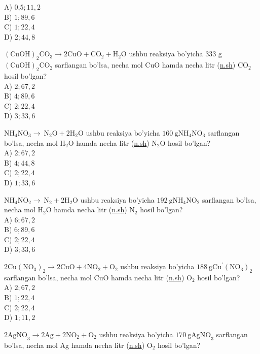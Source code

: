 A) 0,$5 ; 11,2$\\
B) $1 ; 89,6$\\
C) $1 ; 22,4$\\
D) $2 ; 44,8$
  \item $(\mathrm{CuOH})_{2} \mathrm{CO}_{3} \rightarrow 2 \mathrm{CuO}+\mathrm{CO}_{2}+\mathrm{H}_{2} \mathrm{O}$ ushbu reaksiya bo'yicha 333 g $(\mathrm{CuOH})_{2} \mathrm{CO}_{2}$ sarflangan bo'lsa, necha mol CuO hamda necha litr (\href{http://n.sh}{n.sh}) $\mathrm{CO}_{2}$ hosil bo'lgan?\\
A) $2 ; 67,2$\\
B) $4 ; 89,6$\\
C) $2 ; 22,4$\\
D) $3 ; 33,6$
  \item $\mathrm{NH}_{4} \mathrm{NO}_{3} \rightarrow \mathrm{~N}_{2} \mathrm{O}+2 \mathrm{H}_{2} \mathrm{O}$ ushbu reaksiya bo'yicha $160 \mathrm{~g} \mathrm{NH}_{4} \mathrm{NO}_{3}$ sarflangan bo'lsa, necha mol $\mathrm{H}_{2} \mathrm{O}$ hamda necha litr (\href{http://n.sh}{n.sh}) $\mathrm{N}_{2} \mathrm{O}$ hosil bo'lgan?\\
A) $2 ; 67,2$\\
B) $4 ; 44,8$\\
C) $2 ; 22,4$\\
D) $1 ; 33,6$
  \item $\mathrm{NH}_{4} \mathrm{NO}_{2} \rightarrow \mathrm{~N}_{2}+2 \mathrm{H}_{2} \mathrm{O}$ ushbu reaksiya bo'yicha $192 \mathrm{~g} \mathrm{NH}_{4} \mathrm{NO}_{2}$ sarflangan bo'lsa, necha mol $\mathrm{H}_{2} \mathrm{O}$ hamda necha litr (\href{http://n.sh}{n.sh}) $\mathrm{N}_{2}$ hosil bo'lgan?\\
A) $6 ; 67,2$\\
B) $6 ; 89,6$\\
C) $2 ; 22,4$\\
D) $3 ; 33,6$
  \item $2 \mathrm{Cu}\left(\mathrm{NO}_{3}\right)_{2} \rightarrow 2 \mathrm{CuO}+4 \mathrm{NO}_{2}+\mathrm{O}_{2}$ ushbu reaksiya bo'yicha $188 \mathrm{~g} \mathrm{Cu}^{\prime}\left(\mathrm{NO}_{3}\right)_{2}$ sarflangan bo'lsa, necha mol CuO hamda necha litr (\href{http://n.sh}{n.sh}) $\mathrm{O}_{2}$ hosil bo'lgan?\\
A) $2 ; 67,2$\\
B) $1 ; 22,4$\\
C) $2 ; 22,4$\\
D) $1 ; 11,2$
  \item $2 \mathrm{AgNO}_{3} \rightarrow 2 \mathrm{Ag}+2 \mathrm{NO}_{2}+\mathrm{O}_{2}$ ushbu reaksiya bo'yicha $170 \mathrm{~g} \mathrm{AgNO}_{3}$ sarflangan bo'lsa, necha mol Ag hamda necha litr (\href{http://n.sh}{n.sh}) $\mathrm{O}_{2}$ hosil bo'lgan?\\

